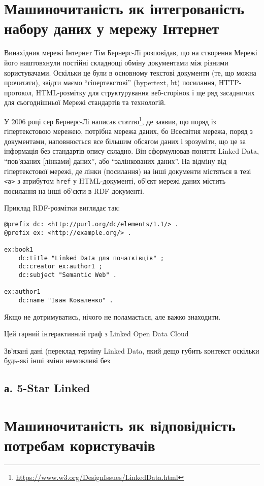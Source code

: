 \documentclass[
]{agujournal2019}
\begin{document}
\section{Машиночитаність як інтегрованість набору даних у мережу
Інтернет}\label{ux43cux430ux448ux438ux43dux43eux447ux438ux442ux430ux43dux456ux441ux442ux44c-ux44fux43a-ux456ux43dux442ux435ux433ux440ux43eux432ux430ux43dux456ux441ux442ux44c-ux43dux430ux431ux43eux440ux443-ux434ux430ux43dux438ux445-ux443-ux43cux435ux440ux435ux436ux443-ux456ux43dux442ux435ux440ux43dux435ux442}

Винахідник мережі Інтернет Тім Бернерс-Лі розповідав, що на створення
Мережі його наштовхнули постійні складнощі обміну документами між
різними користувачами. Оскільки це були в основному текстові документи
(те, що можна прочитати), звідти маємо ``гіпертекстові'' (hypertext, ht)
посилання, HTTP-протокол, HTML-розмітку для структурування веб-сторінок
і ще ряд засадничих для сьогоднішньої Мережі стандартів та технологій.

У 2006 році сер Бернерс-Лі написав статтю\footnote{\url{https://www.w3.org/DesignIssues/LinkedData.html}},
де заявив, що поряд із гіпертекстовою мережею, потрібна мережа даних, бо
Всесвітня мережа, поряд з документами, наповнюється все більшим обсягом
даних і зрозуміти, що це за інформація без стандартів опису складно. Він
сформулював поняття Linked Data, ``пов'язаних {[}лінками{]} даних'', або
``залінкованих даних''. На відміну від гіпертекстової мережі, де лінки
(посилання) на інші документи містяться в тезі
\texttt{\textless{}a\textgreater{}} з атрибутом \texttt{href} у
HTML-документі, об'єкт мережі даних містить посилання на інші об'єкти в
RDF-документі.

Приклад RDF-розмітки виглядає так:

\begin{verbatim}
@prefix dc: <http://purl.org/dc/elements/1.1/> .
@prefix ex: <http://example.org/> .

ex:book1
    dc:title "Linked Data для початківців" ;
    dc:creator ex:author1 ;
    dc:subject "Semantic Web" .

ex:author1
    dc:name "Іван Коваленко" .
\end{verbatim}

Якщо не дотримуватись, нічого не поламається, але важко знаходити.

Цей гарний інтерактивний граф з Linked Open Data Cloud

Зв'язані дані (переклад терміну Linked Data, який дещо губить контекст
оскільки будь-які інші зміни неможливі без

\subsection{а. 5-Star Linked}\label{ux430.-5-star-linked}

\section{Машиночитаність як відповідність потребам
користувачів}\label{sec-data-methods}
\end{document}
